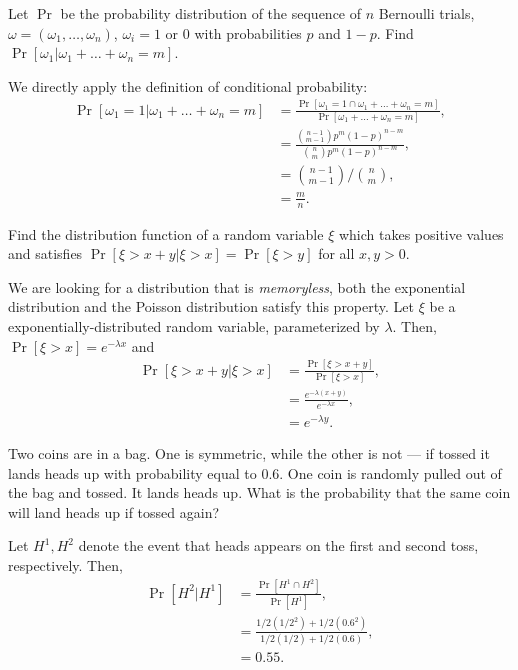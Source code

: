 \begin{problem}{1}
    Let $\Pr$ be the probability distribution of the sequence of $n$ Bernoulli trials, $\omega = (\omega_1,\ldots,\omega_n)$, $\omega_i = 1$ or 0 with probabilities $p$ and $1-p$. Find $\Pr[\omega_1|\omega_1+\ldots+\omega_n=m]$.
\end{problem}
\begin{solution}
We directly apply the definition of conditional probability:
\begin{align*}
    \Pr[\omega_1 = 1 | \omega_1 + \ldots + \omega_n = m] &= \frac{\Pr[\omega_1 = 1 \cap \omega_1 + \ldots + \omega_n = m]}{\Pr[\omega_1 + \ldots + \omega_n = m]}, \\
    &= \frac{\binom{n-1}{m-1}p^m(1-p)^{n-m}}{\binom{n}{m}p^m(1-p)^{n-m}}, \\
    &= \binom{n-1}{m-1} \big/ \binom{n}{m}, \\
    &= \frac{m}{n}.
\end{align*}
\end{solution}
\begin{problem}{2}
    Find the distribution function of a random variable $\xi$ which takes positive values and satisfies $\Pr[\xi > x + y | \xi > x] = \Pr[\xi > y]$ for all $x,y> 0$. 
\end{problem}
\begin{solution}
    We are looking for a distribution that is \textit{memoryless}, both the exponential distribution and the Poisson distribution satisfy this property. Let $\xi$ be a exponentially-distributed random variable, parameterized by $\lambda$. Then, 
    $\Pr[\xi > x] = e^{-\lambda x}$ and 
    \begin{align*}
        \Pr[\xi > x+y | \xi > x] &= \frac{\Pr[\xi > x+y]}{\Pr[\xi > x]}, \\
        &= \frac{e^{-\lambda(x+y)}}{e^{-\lambda x}}, \\
        &= e^{-\lambda y}.
    \end{align*}
\end{solution}
\begin{problem}{3}
    Two coins are in a bag. One is symmetric, while the other is not --- if tossed it lands heads up with probability equal to 0.6. One coin is randomly pulled out of the bag and tossed. It lands heads up. What is the probability that the same coin will land heads up if tossed again?
\end{problem}
\begin{solution}
    Let $H^1, H^2$ denote the event that heads appears on the first and second toss, respectively. Then,
    \begin{align*}
        \Pr[H^2|H^1] &= \frac{\Pr[H^1 \cap H^2]}{\Pr[H^1]}, \\
        &= \frac{1/2(1/2^2) + 1/2(0.6^2)}{1/2(1/2) + 1/2(0.6)}, \\
        &= 0.55.
    \end{align*}
\end{solution}
